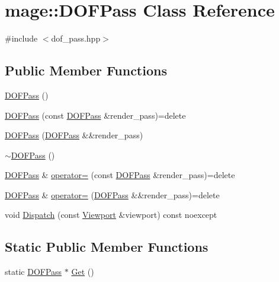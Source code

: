 \hypertarget{classmage_1_1_d_o_f_pass}{}\section{mage\+:\+:D\+O\+F\+Pass Class Reference}
\label{classmage_1_1_d_o_f_pass}


{\ttfamily \#include $<$dof\+\_\+pass.\+hpp$>$}

\subsection*{Public Member Functions}
\begin{DoxyCompactItemize}
\item 
\hyperlink{classmage_1_1_d_o_f_pass_a11dccae5f2613da112845158f69727e7}{D\+O\+F\+Pass} ()
\item 
\hyperlink{classmage_1_1_d_o_f_pass_a481180bac0436c5e3f627fcd810e699c}{D\+O\+F\+Pass} (const \hyperlink{classmage_1_1_d_o_f_pass}{D\+O\+F\+Pass} \&render\+\_\+pass)=delete
\item 
\hyperlink{classmage_1_1_d_o_f_pass_aa591f5cac76b37e4d0f765143385bdea}{D\+O\+F\+Pass} (\hyperlink{classmage_1_1_d_o_f_pass}{D\+O\+F\+Pass} \&\&render\+\_\+pass)
\item 
\hyperlink{classmage_1_1_d_o_f_pass_a2a46bc7b2579f1d67fd412c89386d2f4}{$\sim$\+D\+O\+F\+Pass} ()
\item 
\hyperlink{classmage_1_1_d_o_f_pass}{D\+O\+F\+Pass} \& \hyperlink{classmage_1_1_d_o_f_pass_ab708ec4fdf564d5ce38453e7d46d04d8}{operator=} (const \hyperlink{classmage_1_1_d_o_f_pass}{D\+O\+F\+Pass} \&render\+\_\+pass)=delete
\item 
\hyperlink{classmage_1_1_d_o_f_pass}{D\+O\+F\+Pass} \& \hyperlink{classmage_1_1_d_o_f_pass_a8547ec1bb4e56faf3299e0793566b785}{operator=} (\hyperlink{classmage_1_1_d_o_f_pass}{D\+O\+F\+Pass} \&\&render\+\_\+pass)=delete
\item 
void \hyperlink{classmage_1_1_d_o_f_pass_a772b6b1b4a1f5a588f2c3342ef187db6}{Dispatch} (const \hyperlink{classmage_1_1_viewport}{Viewport} \&viewport) const noexcept
\end{DoxyCompactItemize}
\subsection*{Static Public Member Functions}
\begin{DoxyCompactItemize}
\item 
static \hyperlink{classmage_1_1_d_o_f_pass}{D\+O\+F\+Pass} $\ast$ \hyperlink{classmage_1_1_d_o_f_pass_a93327517f36b8558d6bdffedb6179298}{Get} ()
\end{DoxyCompactItemize}

